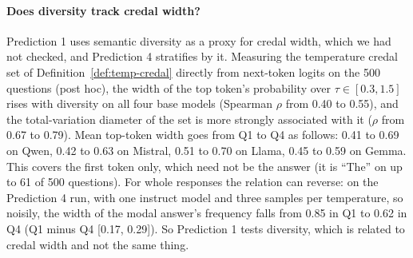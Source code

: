 \paragraph{Does diversity track credal width?} \label{sec:width-check} Prediction 1 uses semantic diversity as a proxy for credal width, which we had not checked, and Prediction 4 stratifies by it. Measuring the temperature credal set of Definition~\ref{def:temp-credal} directly from next-token logits on the 500 questions (post hoc), the width of the top token's probability over $\tau \in [0.3, 1.5]$ rises with diversity on all four base models (Spearman $\rho$ from 0.40 to 0.55), and the total-variation diameter of the set is more strongly associated with it ($\rho$ from 0.67 to 0.79). Mean top-token width goes from Q1 to Q4 as follows: 0.41 to 0.69 on Qwen, 0.42 to 0.63 on Mistral, 0.51 to 0.70 on Llama, 0.45 to 0.59 on Gemma. This covers the first token only, which need not be the answer (it is ``The'' on up to 61 of 500 questions). For whole responses the relation can reverse: on the Prediction 4 run, with one instruct model and three samples per temperature, so noisily, the width of the modal answer's frequency falls from 0.85 in Q1 to 0.62 in Q4 (Q1 minus Q4 [0.17, 0.29]). So Prediction 1 tests diversity, which is related to credal width and not the same thing.
